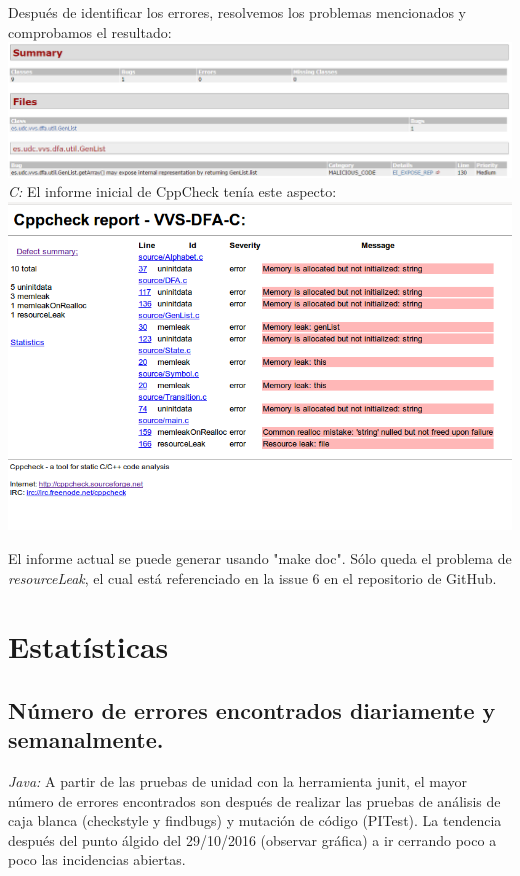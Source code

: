 \documentclass[DIV=calc,paper=a4,fontsize=11pt,onecolumn]{scrartcl} %
\newcommand{\hint}[1]{\begin{quote}\itshape #1 \end{quote}}
\begin{document}
	Después de identificar los errores, resolvemos los problemas mencionados y comprobamos el resultado:\\
	
	\includegraphics[width=15cm]{Imagenes/findBugs2.png} \\

	\textit{C:} El informe inicial de CppCheck tenía este aspecto: \\

	\includegraphics[width=15cm]{Imagenes/cppcheck.png}

	El informe actual se puede generar usando "make doc". Sólo queda el problema de \textit{resourceLeak}, el cual está referenciado en la issue 6 en el repositorio de GitHub. \\

\section{Estatísticas}

  
  	\subsection{Número de errores encontrados diariamente y semanalmente.}
  	\textit{Java: }A partir de las pruebas de unidad con la herramienta junit, el mayor número de errores encontrados son después de realizar las pruebas de análisis de caja blanca (checkstyle y findbugs) y mutación de código (PITest). La tendencia después del punto álgido del 29/10/2016 (observar gráfica) a ir cerrando poco a poco las incidencias abiertas. 
  	
\end{document}
